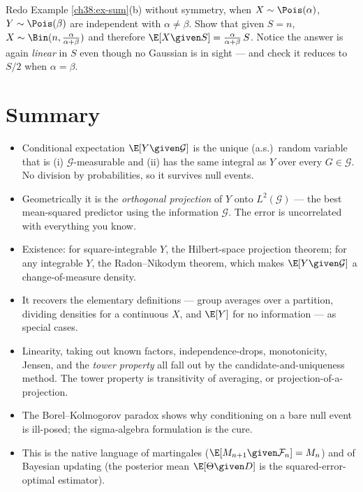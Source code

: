 \begin{labbox}
Redo Example \ref{ch38:ex-sum}(b) without symmetry, when $X \sim \Pois(\alpha)$, $Y \sim
\Pois(\beta)$ are independent with $\alpha \ne \beta$. Show that given $S = n$, $X \sim \Bin(n,
\tfrac{\alpha}{\alpha+\beta})$ and therefore $\E[X\given S] = \tfrac{\alpha}{\alpha+\beta}\,S$. Notice
the answer is again \emph{linear} in $S$ even though no Gaussian is in sight --- and check it reduces
to $S/2$ when $\alpha = \beta$.
\end{labbox}

\section{Summary}
\label{ch38:summary}

\begin{recoverybox}
\begin{itemize}
  \item Conditional expectation $\E[Y\given\mathcal{G}]$ is the unique (a.s.)\ random variable that is
    (i) $\mathcal{G}$-measurable and (ii) has the same integral as $Y$ over every $G \in \mathcal{G}$.
    No division by probabilities, so it survives null events.
  \item Geometrically it is the \emph{orthogonal projection} of $Y$ onto $L^2(\mathcal{G})$ --- the
    best mean-squared predictor using the information $\mathcal{G}$. The error is uncorrelated with
    everything you know.
  \item Existence: for square-integrable $Y$, the Hilbert-space projection theorem; for any integrable
    $Y$, the Radon--Nikodym theorem, which makes $\E[Y\given\mathcal{G}]$ a change-of-measure density.
  \item It recovers the elementary definitions --- group averages over a partition, dividing densities
    for a continuous $X$, and $\E[Y]$ for no information --- as special cases.
  \item Linearity, taking out known factors, independence-drops, monotonicity, Jensen, and the
    \emph{tower property} all fall out by the candidate-and-uniqueness method. The tower property is
    transitivity of averaging, or projection-of-a-projection.
  \item The Borel--Kolmogorov paradox shows why conditioning on a bare null event is ill-posed; the
    sigma-algebra formulation is the cure.
  \item This is the native language of martingales ($\E[M_{n+1}\given\mathcal{F}_n] = M_n$) and of
    Bayesian updating (the posterior mean $\E[\Theta\given D]$ is the squared-error-optimal estimator).
\end{itemize}
\end{recoverybox}

